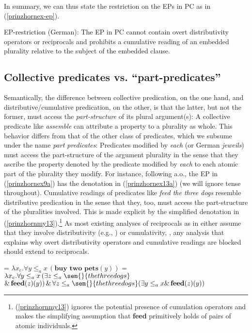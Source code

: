 \documentclass[output=paper,colorlinks,citecolor=brown,
]{langscibook}
\begin{document}
In summary, we can thus state the restriction on the EPs in PC as in (\ref{prinzhornex-ep}).  


\ea EP-restriction (German):  The EP in PC cannot contain overt distributivity operators or reciprocals and prohibits a cumulative reading of an embedded plurality relative to the subject of the embedded clause. \label{prinzhornex-ep} \z

\subsection{Collective predicates vs. “part-predicates”}\label{prinzhornsec:2.2}

Semantically, the difference between collective predication, on the one hand,  and distributive/cumulative predication, on the other, is that the latter, but not the former, must access the {\it part-structure} of its plural argument(s): A collective predicate like {\it assemble} can attribute a property to a plurality as whole. This behavior differs from that of the other class of predicates, which we subsume under the name \textit{part predicates}:  Predicates modified by {\it each} (or German {\it jeweils}) must access the part-structure of the argument plurality in the sense that they ascribe the property denoted by the predicate modified by \textit{each} to each atomic part of the plurality they modify.  For instance, following \citet{Link:1987} a.o., the EP in (\ref{prinzhornex9a}) has the denotation in (\ref{prinzhornex13a}) (we will ignore tense throughout). Cumulative readings of predicates like \textit{feed the three dogs} resemble distributive predication in the sense that they, too, must access the part-structure of the pluralities involved. This is made explicit by the simplified denotation in (\ref{prinzhornmy13}).\footnote{(\ref{prinzhornmy13}) ignores the potential presence of cumulation operators and makes the simplifying assumption that {\bf feed} primitively holds of pairs of atomic individuals.} 
As most existing analyses of reciprocals as in  either assume that they involve distributivity (e.g., \citealt{Heim:1991}) or cumulativity, \citep{Beck:2001}, any analysis that explains why overt distributivity operators and cumulative readings are blocked should extend to reciprocals.

\ea	 
\ea {} = $\lambda x_{e}. \forall y \le_{a} x \,(\textbf{buy two pets}(y))$\label{prinzhornex13a}
\ex	{} = $\lambda x_{e}. \forall y \le_{a} x \,(\exists z \le_{a} \sem{}{the three dogs}$\\$ \&\,\textbf{feed}(z)(y)) \,\&\, \forall z \le_{a} \sem{}{the three dogs} (\exists y \le_{a} x \&\, \textbf{feed}(z)(y))$\label{prinzhornmy13}
\z\z
\end{document}
